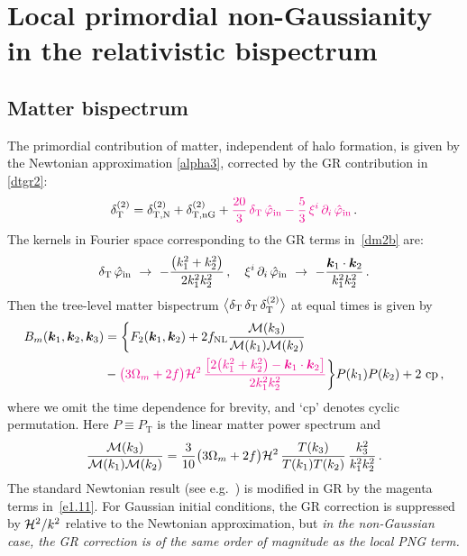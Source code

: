 {{{\section{Local primordial non-Gaussianity in the relativistic bispectrum}\label{sec3}
\vspace*{0.5cm}
\subsection{Matter bispectrum}
%
{The primordial contribution of matter, independent of halo formation,  is given by the Newtonian approximation \eqref{alpha3},  corrected by the GR contribution in \eqref{dtgr2}:
\begin{equation}
\delta^{{(2)}}_{{\mathrm{T}}} = \delta^{{(2)}}_{{\mathrm{T,N}}} + {\delta^{{(2)}}_{{\mathrm{T,nG}}}} + {\color{magenta}{ \frac{20}{3}\, \delta_{{\mathrm{T}}}\,{\hat\varphi_{{\mathrm{in}}}} - \frac{5}{3}\, \xi^i\,\partial_i\,{\hat\varphi_{{\mathrm{in}}}}}}\,. \label{dm2b}
\end{equation}
The kernels in Fourier space corresponding to the GR terms in~\eqref{dm2b} are:
\begin{equation}
\delta_{{\mathrm{T}}}\,{\hat\varphi_{\mathrm{in}}}~\rightarrow~- \frac{\big(k_1^2+ k_2^2\big)}{2 k_1^2 k_2^2}\,,\quad
 \xi^i\,\partial_i\,{\hat\varphi_{\mathrm{in}}} ~\rightarrow~ - \frac{{\bm {k}}_1\cdot {\bm {k}}_2}{k_1^2 k_2^2} \,.
\end{equation}
Then the  tree-level matter bispectrum  $\big\langle \delta_{\mathrm T}\, \delta_{\mathrm T}\,\delta^{{(2)}}_{\mathrm{T}} \big \rangle$ at equal times is  given  by 
\begin{align}
B_m(\bm{k}_{1},\bm{k}_{2},\bm{k}_{3}) &= \bigg\{ F_{2}(\bm{k}_{1},\bm{k}_{2})
+{2f_\text{NL}} \frac{{\cal M}(k_3)}{{\cal M}(k_1) {\cal M}(k_2)}
\notag\\
&-{\color{magenta}{\big(3\Omega_m+2f\big) \mathcal{H}^2 \, \frac{\big[2\big(k_1^2+ k_2^2\big) - {\bm {k}}_1\cdot {\bm {k}}_2 \big]}{2k_1^2 k_2^2}}} \bigg\}
P(k_{1})P(k_{2}) + \mbox{2 cp}\,, \label{e1.11} 
\end{align} 
where  we  omit the time dependence for brevity, and `cp' denotes cyclic permutation. 
Here
$P\equiv P_{\mathrm{T}}$ is the linear matter power spectrum and}
\begin{equation}
\frac{{\cal M}(k_3)}{{\cal M}(k_1) {\cal M}(k_2)} = \frac{3}{10} \big(3\Omega_m+2f \big)
\mathcal{H}^2\, \frac{T(k_3)}{T(k_1) T(k_2)}\, \frac{k_3^2}{k_1^2 k_2^2}\,.
\end{equation}
The standard Newtonian result (see e.g.~\cite{Tellarini:2015faa}) is modified in GR by the magenta terms in~\eqref{e1.11}. 
For Gaussian initial conditions, the GR correction is suppressed by $\mathcal{H}^2/k^2$ relative to the Newtonian approximation, but {\em in the non-Gaussian case, the GR correction is of the same order of magnitude as the local PNG term.}

}}}
